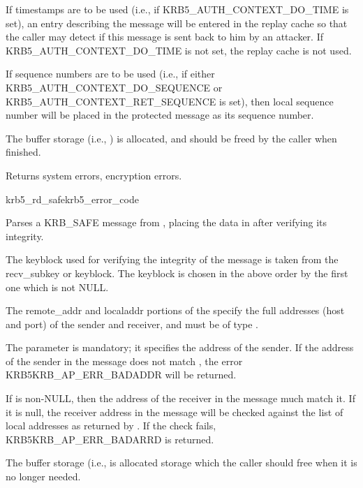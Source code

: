 If timestamps are to be used (i.e., if KRB5_AUTH_CONTEXT_DO_TIME is
set), an entry describing the message will be entered in the replay
cache so that the caller may detect if this message is sent
back to him by an attacker.  If KRB5_AUTH_CONTEXT_DO_TIME is not set,
the  replay cache is not used.

If sequence numbers are to be used (i.e., if either
KRB5_AUTH_CONTEXT_DO_SEQUENCE or KRB5_AUTH_CONTEXT_RET_SEQUENCE is
set), then  local sequence number will be
placed in the protected message as its sequence number.  

The  buffer storage (i.e.,
) is allocated, and should be freed by
the caller when finished.

Returns system errors, encryption errors.

\begin{funcdecl}{krb5_rd_safe}{krb5_error_code}{\funcinout}
\funcin
{}
\funcout
{}
\funcinout
{}
\end{funcdecl}

Parses a KRB_SAFE message from , placing the
data in  after verifying its integrity.

The keyblock used for verifying the integrity of the message is taken
from the  recv\_subkey or keyblock. The
keyblock is chosen in the above order by the first one which is not
NULL.
 
The remote_addr and localaddr portions of the 
specify the full addresses (host and port) of the sender and receiver,
and must be of type .


The  parameter is mandatory; it
specifies the address of the sender.  If the address of the sender in
the message does not match , the error
KRB5KRB_AP_ERR_BADADDR will be returned.

If  is non-NULL, then the address of the receiver
in the message much match it.  If it is null, the receiver address in
the message will be checked against the list of local addresses as
returned by . If the check fails,
KRB5KRB_AP_ERR_BADARRD is returned.

The  buffer storage (i.e.,
 is allocated storage which the caller
should free when it is no longer needed.


